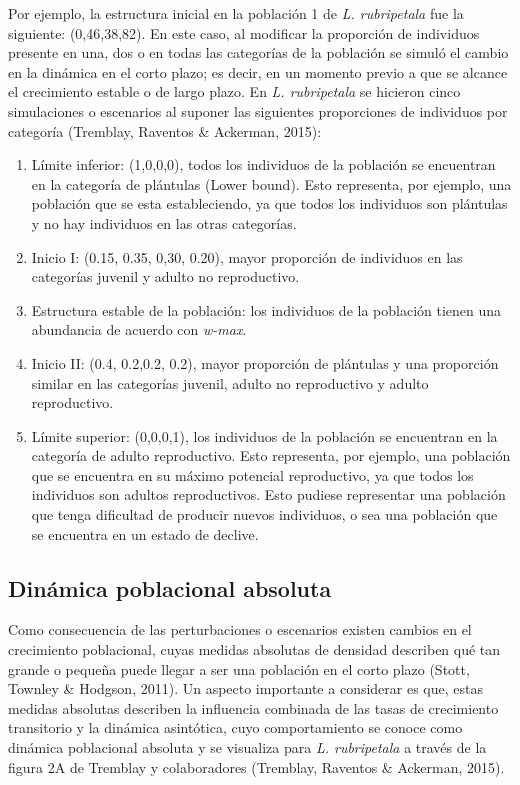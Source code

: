 \documentclass[
  12pt,
  letterpaper,
]{book}
\providecommand{\tightlist}{%
  \setlength{\itemsep}{0pt}\setlength{\parskip}{0pt}}\usepackage{longtable,booktabs,array}
\begin{document}
Por ejemplo, la estructura inicial en la población 1 de \emph{L.
rubripetala} fue la siguiente: (0,46,38,82). En este caso, al modificar
la proporción de individuos presente en una, dos o en todas las
categorías de la población se simuló el cambio en la dinámica en el
corto plazo; es decir, en un momento previo a que se alcance el
crecimiento estable o de largo plazo. En \emph{L. rubripetala} se
hicieron cinco simulaciones o escenarios al suponer las siguientes
proporciones de individuos por categoría (Tremblay, Raventos \&
Ackerman, 2015):

\begin{enumerate}
\def\labelenumi{\arabic{enumi}.}
\tightlist
\item
  Límite inferior: (1,0,0,0), todos los individuos de la población se
  encuentran en la categoría de plántulas (Lower bound). Esto
  representa, por ejemplo, una población que se esta estableciendo, ya
  que todos los individuos son plántulas y no hay individuos en las
  otras categorías.
\item
  Inicio I: (0.15, 0.35, 0,30, 0.20), mayor proporción de individuos en
  las categorías juvenil y adulto no reproductivo.
\item
  Estructura estable de la población: los individuos de la población
  tienen una abundancia de acuerdo con \emph{w-max}.
\item
  Inicio II: (0.4, 0.2,0.2, 0.2), mayor proporción de plántulas y una
  proporción similar en las categorías juvenil, adulto no reproductivo y
  adulto reproductivo.
\item
  Límite superior: (0,0,0,1), los individuos de la población se
  encuentran en la categoría de adulto reproductivo. Esto representa,
  por ejemplo, una población que se encuentra en su máximo potencial
  reproductivo, ya que todos los individuos son adultos reproductivos.
  Esto pudiese representar una población que tenga dificultad de
  producir nuevos individuos, o sea una población que se encuentra en un
  estado de declive.
\end{enumerate}

\subsection{Dinámica poblacional
absoluta}\label{dinuxe1mica-poblacional-absoluta}

Como consecuencia de las perturbaciones o escenarios existen cambios en
el crecimiento poblacional, cuyas medidas absolutas de densidad
describen qué tan grande o pequeña puede llegar a ser una población en
el corto plazo (Stott, Townley \& Hodgson, 2011). Un aspecto importante
a considerar es que, estas medidas absolutas describen la influencia
combinada de las tasas de crecimiento transitorio y la dinámica
asintótica, cuyo comportamiento se conoce como dinámica poblacional
absoluta y se visualiza para \emph{L. rubripetala} a través de la figura
2A de Tremblay y colaboradores (Tremblay, Raventos \& Ackerman, 2015).
\end{document}
